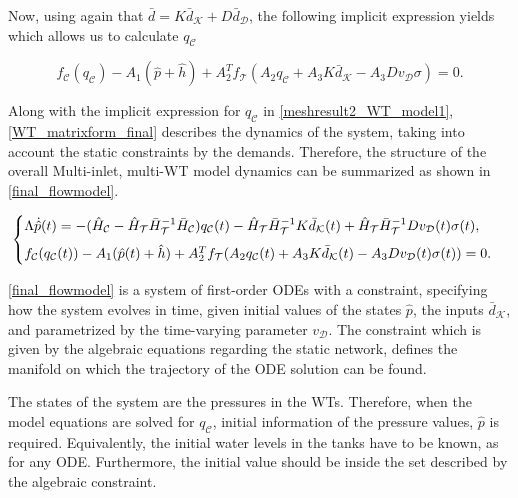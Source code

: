 Now, using again that $\bar{d} = K \bar{d}_{\mathcal{K}} + D \bar{d}_{\mathcal{D}}$, the following implicit expression yields which allows us to calculate $q_\mathcal{C}$

 \begin{equation}
\label{meshresult2_WT_model1}
f_{\mathcal{C}}(q_\mathcal{C}) - A_1(\hat{p} + \hat{h}) + A_2^T f_{\mathcal{T}}(A_2 q_\mathcal{C} + A_3 K \bar{d}_{\mathcal{K}} - A_3 D v_{\mathcal{D}} \sigma) = 0.
\end{equation} 

Along with the implicit expression for $q_\mathcal{C}$ in \eqref{meshresult2_WT_model1}, \eqref{WT_matrixform_final} describes the dynamics of the system, taking into account the static constraints by the demands. Therefore, the structure of the overall Multi-inlet, multi-WT model dynamics can be summarized as shown in \eqref{final_flowmodel}.

\begin{equation}
\label{final_flowmodel}
\begin{cases}
    \Lambda \dot{\hat{p}}(t) = - (\hat{H}_{\mathcal{C}} - \hat{H}_{\mathcal{T}} \bar{H}^{-1}_{\mathcal{T}}\bar{H}_{\mathcal{C}})  q_\mathcal{C}(t)  - \hat{H}_{\mathcal{T}} \bar{H}^{-1}_{\mathcal{T}} K \bar{d}_{\mathcal{K}}(t) + \hat{H}_{\mathcal{T}} \bar{H}^{-1}_{\mathcal{T}} D v_{\mathcal{D}}(t) \sigma(t), \vspace{2mm}\\
    f_{\mathcal{C}}(q_\mathcal{C}(t)) - A_1(\hat{p}(t) + \hat{h}) + A_2^T f_{\mathcal{T}}(A_2 q_\mathcal{C}(t) + A_3 K \bar{d}_{\mathcal{K}}(t) - A_3 D v_{\mathcal{D}}(t) \sigma(t)) = 0.
\end{cases}
\end{equation}

\eqref{final_flowmodel} is a system of first-order ODEs with a constraint, specifying how the system evolves in time, given initial values of the states $\hat{p}$, the inputs $\bar{d}_{\mathcal{K}}$, and parametrized by the time-varying parameter $v_{\mathcal{D}}$. The constraint which is given by the algebraic equations regarding the static network, defines the manifold on which the trajectory of the ODE solution can be found. 

The states of the system are the pressures in the WTs. Therefore, when the model equations are solved for $q_\mathcal{C}$, initial information of the pressure values, $\hat{p}$ is required. Equivalently, the initial water levels in the tanks have to be known, as for any ODE. Furthermore, the initial value should be inside the set described by the algebraic constraint. 

